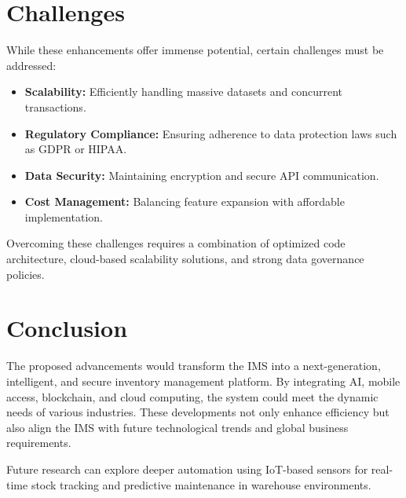 \documentclass[12pt,a4paper]{article}
\begin{document}
\section{Challenges}
While these enhancements offer immense potential, certain challenges must be addressed:
\begin{itemize}
    \item \textbf{Scalability:} Efficiently handling massive datasets and concurrent transactions.
    \item \textbf{Regulatory Compliance:} Ensuring adherence to data protection laws such as GDPR or HIPAA.
    \item \textbf{Data Security:} Maintaining encryption and secure API communication.
    \item \textbf{Cost Management:} Balancing feature expansion with affordable implementation.
\end{itemize}

Overcoming these challenges requires a combination of optimized code architecture, cloud-based scalability solutions, and strong data governance policies.

\section{Conclusion}
The proposed advancements would transform the IMS into a next-generation, intelligent, and secure inventory management platform. By integrating AI, mobile access, blockchain, and cloud computing, the system could meet the dynamic needs of various industries. These developments not only enhance efficiency but also align the IMS with future technological trends and global business requirements.

Future research can explore deeper automation using IoT-based sensors for real-time stock tracking and predictive maintenance in warehouse environments.
\end{document}
